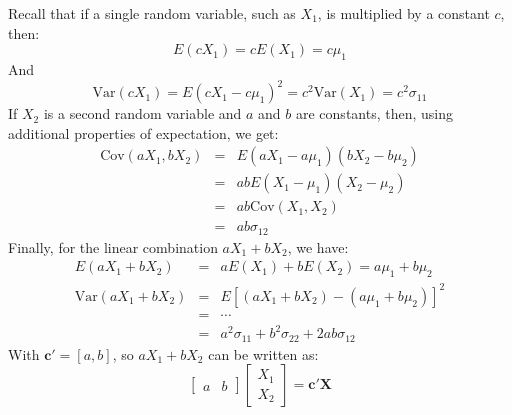 \documentclass[a4paper]{article}
\newcommand{\Var}{\mathrm{Var}}
\newcommand{\Cov}{\mathrm{Cov}}
\begin{document}
    Recall that if a single random variable, such as $X_{1}$, is multiplied by a constant $c$, then:
    \begin{equation*}
        E\left(cX_{1}\right) = cE\left(X_{1}\right) = c\mu_{1}
    \end{equation*}
    And
    \begin{equation*}
        \Var\left(cX_{1}\right) = E\left(cX_{1} - c\mu_{1}\right)^{2} = c^{2}\Var\left(X_{1}\right) = c^{2}\sigma_{11}
    \end{equation*}
    If $X_{2}$ is a second random variable and $a$ and $b$ are constants, then, using additional properties of expectation, we get:
    \begin{equation*}
        \begin{array}{rcl}
            \Cov\left(aX_{1}, bX_{2}\right) &=& E\left(aX_{1} - a\mu_{1}\right)\left(bX_{2} - b\mu_{2}\right) \\ [.5em]
            &=& abE\left(X_{1} - \mu_{1}\right)\left(X_{2} - \mu_{2}\right) \\ [.5em]
            &=& ab\Cov\left(X_{1}, X_{2}\right) \\ [.5em]
            &=& ab \sigma_{12}
        \end{array}
    \end{equation*}
    Finally, for the linear combination $aX_{1} + bX_{2}$, we have:
    \begin{equation}\label{eq: linear combinations of random variables (mean vector and covariance matrix)}
        \begin{array}{rcl}
            E\left(aX_{1} + bX_{2}\right) &=& aE\left(X_{1}\right) + bE\left(X_{2}\right) = a\mu_{1} + b\mu_{2} \\ [.5em]
            \Var\left(aX_{1} + bX_{2}\right) &=& E\left[\left(aX_{1} + bX_{2}\right) - \left(a\mu_{1}+b\mu_{2}\right)\right]^{2} \\ [.5em]
            &=& \cdots \\ [.5em]
            &=& a^{2}\sigma_{11} + b^{2}\sigma_{22} + 2 ab \sigma_{12}
        \end{array}
    \end{equation}
    With $\mathbf{c}' = \left[a, b\right]$, so $aX_{1} + bX_{2}$ can be written as:
    \begin{equation*}
        \begin{bmatrix}
            a & b
        \end{bmatrix}
        \begin{bmatrix}
            X_{1} \\ X_{2}
        \end{bmatrix} = \mathbf{c}'\mathbf{X}
    \end{equation*}
\end{document}

